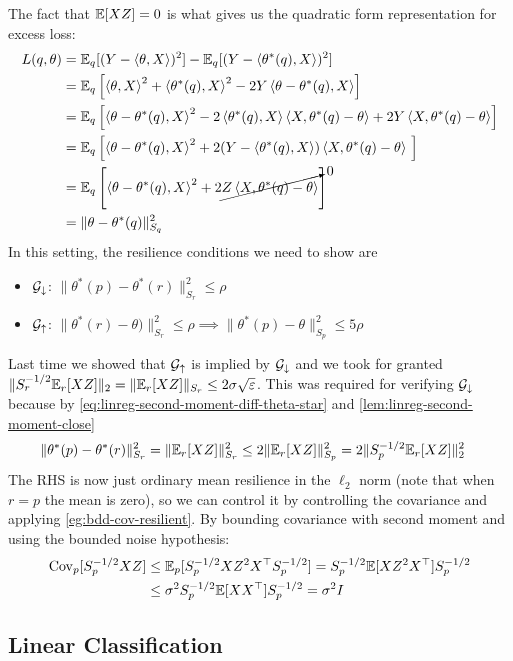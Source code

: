 The fact that $\mathbb{E}[X Z] = 0$ is what gives us the quadratic form representation
for excess loss:
\begin{align}
  L(q, \theta)
  &= \mathbb{E}_q[(Y - \braket{\theta, X})^2] - \mathbb{E}_q[(Y - \braket{\theta^*(q), X})^2] \\
  &= \mathbb{E}_q\left[
    \braket{\theta, X}^2
    + \braket{\theta^*(q), X}^2
    - 2 Y \braket{\theta - \theta^*(q), X}
  \right] \\
  &= \mathbb{E}_q\left[
    \braket{\theta - \theta^*(q), X}^2
    - 2 \braket{\theta^*(q), X} \braket{X, \theta^*(q) - \theta}
    + 2 Y \braket{X, \theta^*(q) - \theta}
  \right] \\
  &= \mathbb{E}_q\left[
    \braket{\theta - \theta^*(q), X}^2
    + 2 (Y - \braket{\theta^*(q), X}) \braket{X, \theta^*(q) - \theta}\
  \right] \\
  &= \mathbb{E}_q\left[
    \braket{\theta - \theta^*(q), X}^2
    + 2 \cancelto{0}{Z \braket{X, \theta^*(q) - \theta}}
  \right] \\
  &= \|\theta - \theta^*(q)\|_{S_q}^2
\end{align}
In this setting, the resilience conditions we need to show are
\begin{itemize}
  \item $\mathcal{G}_\downarrow$: $\|\theta^*(p) - \theta^*(r)\|_{S_r}^2 \leq \rho$
  \item $\mathcal{G}_\uparrow$: $\|\theta^*(r) - \theta)\|_{S_r}^2 \leq \rho \implies \|\theta^*(p) - \theta\|_{S_p}^2 \leq 5 \rho$
\end{itemize}
Last time we showed that $\mathcal{G}_\uparrow$ is implied by
$\mathcal{G}_\downarrow$ and we took for granted $\|S_r^{-1/2} \mathbb{E}_r[X Z]\|_2 = \|\mathbb{E}_r[X Z]\|_{S_r} \leq 2
\sigma \sqrt{\varepsilon}$. This was required for verifying $\mathcal{G}_\downarrow$ because
by \cref{eq:linreg-second-moment-diff-theta-star}
and \cref{lem:linreg-second-moment-close}
\begin{align}
  \|\theta^*(p) - \theta^*(r)\|_{S_r}^2
  &= \| \mathbb{E}_r[X Z]\|_{S_r}^2
  \leq 2 \| \mathbb{E}_r[X Z]\|_{S_p}^2
  = 2 \| S_p^{-1/2} \mathbb{E}_r[X Z]\|_2^2
\end{align}
The RHS is now just ordinary mean resilience in the $\ell_2$ norm
(note that when $r = p$ the mean is zero), so we can
control it by controlling the covariance and applying
\cref{eg:bdd-cov-resilient}.
By bounding covariance with second moment and using the bounded
noise hypothesis:
\begin{align}
  \operatorname{Cov}_p[S_p^{-1/2} X Z]
  &\leq \mathbb{E}_p[S_p^{-1/2} X Z^2 X^\top S_p^{-1/2}]
  = S_p^{-1/2} \mathbb{E}[X Z^2 X^\top] S_p^{-1/2} \\
  &\leq \sigma^2 S_p^{-1/2} \mathbb{E}[X X^\top] S_p^{-1/2}
  = \sigma^2 I
\end{align} 

\subsection{Linear Classification}


